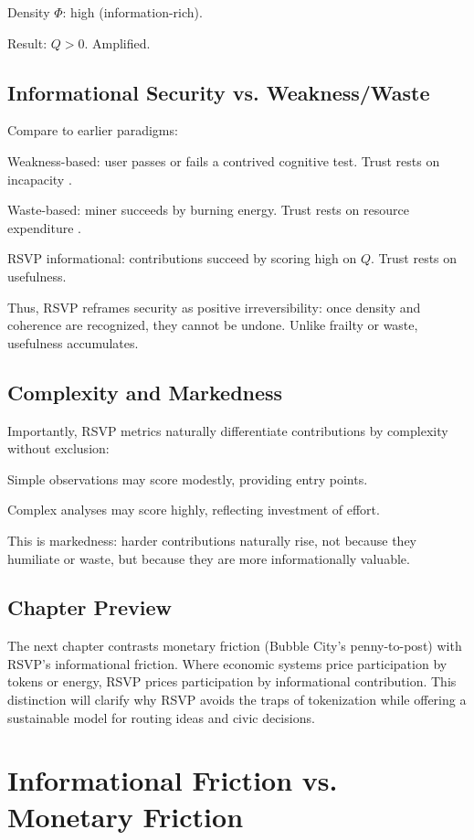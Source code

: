 \documentclass{book}
\begin{document}
Density \( \Phi \): high (information-rich).

Result: \( Q > 0 \). Amplified.

\section{Informational Security vs. Weakness/Waste}

Compare to earlier paradigms:

Weakness-based: user passes or fails a contrived cognitive test. Trust rests on incapacity \cite{conitzer2020}.

Waste-based: miner succeeds by burning energy. Trust rests on resource expenditure \cite{nakamoto2008}.

RSVP informational: contributions succeed by scoring high on \( Q \). Trust rests on usefulness.

Thus, RSVP reframes security as positive irreversibility: once density and coherence are recognized, they cannot be undone. Unlike frailty or waste, usefulness accumulates.

\section{Complexity and Markedness}

Importantly, RSVP metrics naturally differentiate contributions by complexity without exclusion:

Simple observations may score modestly, providing entry points.

Complex analyses may score highly, reflecting investment of effort.

This is markedness: harder contributions naturally rise, not because they humiliate or waste, but because they are more informationally valuable.

\section{Chapter Preview}

The next chapter contrasts monetary friction (Bubble City’s penny-to-post) with RSVP’s informational friction. Where economic systems price participation by tokens or energy, RSVP prices participation by informational contribution. This distinction will clarify why RSVP avoids the traps of tokenization while offering a sustainable model for routing ideas and civic decisions.

\chapter{Informational Friction vs. Monetary Friction}
\end{document}
